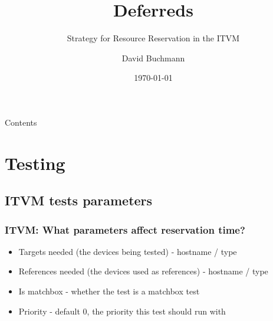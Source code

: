 \documentclass[xcolor=pdftex,dvipsnames,table]{beamer}
\title{Deferreds}
\subtitle{Strategy for Resource Reservation in the ITVM}
\author{David Buchmann}
\institute{Cisco Systems}
\date{\today}
\begin{document}
\maketitle

\begin{frame}[allowframebreaks]{Contents}
  \tableofcontents
\end{frame}

\section{Testing}

\subsection{ITVM tests parameters}
\begin{frame}
  \frametitle{ITVM: What parameters affect reservation time?}
  \begin{itemize}
    \item Targets needed (the devices being tested) - hostname / type
    \item References needed (the devices used as references) -
      hostname / type
    \item Is matchbox - whether the test is a matchbox test
    \item Priority - default 0, the priority this test should run with
  \end{itemize}
\end{frame}
\end{document}
